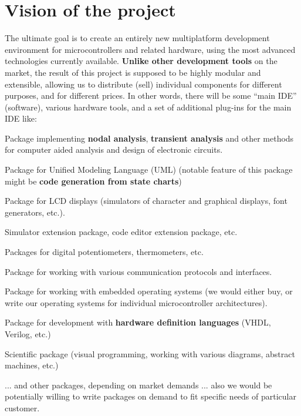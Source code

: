 \documentclass[a4paper,twoside,15pt]{book}
\begin{document}
    \section{Vision of the project}
        The ultimate goal is to create an entirely new multiplatform development environment for microcontrollers and related hardware, using the most advanced technologies currently available. \textbf{Unlike other development tools} on the market, the result of this project is supposed to be highly modular and extensible, allowing us to distribute (sell) individual components for different purposes, and for different prices. In other words, there will be some ``main IDE'' (software), various hardware tools, and a set of additional plug-ins for the main IDE like:
        \begin{dinglist}{73}
            \item Package implementing \textbf{nodal analysis}, \textbf{transient analysis} and other methods for computer aided analysis and design of electronic circuits.
            \item Package for Unified Modeling Language (UML) (notable feature of this package might be \textbf{code generation from state charts})
            \item Package for LCD displays (simulators of character and graphical displays, font generators, etc.).
            \item Simulator extension package, code editor extension package, etc.
            \item Packages for digital potentiometers, thermometers, etc.
            \item Package for working with various communication protocols and interfaces.
            \item Package for working with embedded operating systems (we would either buy, or write our operating systems for individual microcontroller architectures).
            \item Package for development with \textbf{hardware definition languages} (VHDL, Verilog, etc.)
            \item Scientific package (visual programming, working with various diagrams, abstract machines, etc.)
            \item ... and other packages, depending on market demands ... also we would be potentially willing to write packages on demand to fit specific needs of particular customer.
        \end{dinglist}
\end{document}
